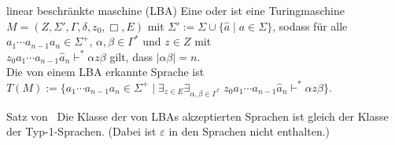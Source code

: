 \begin{Def}{linear beschränkte maschine (LBA)}
    Eine  oder
     ist eine Turingmaschine
    $M = (Z, \Sigma', \Gamma, \delta, z_0, \Box, E)$ mit
    $\Sigma' := \Sigma \cup \{\widehat{a} \;|\; a \in \Sigma\}$,
    sodass für alle $a_1 \dotsb a_{n-1} a_n \in \Sigma^+$,
    $\alpha, \beta \in \Gamma^\ast$ und $z \in Z$ mit\\
    $z_0 a_1 \dotsb a_{n-1} \widehat{a}_{n} \vdash^\ast \alpha z \beta$ gilt,
    dass $|\alpha \beta| = n$.\\
    Die von einem LBA erkannte Sprache ist\\
    $T(M) := \{a_1 \dotsb a_{n-1} a_n \in \Sigma^+ \;|\;
    \exists_{z \in E} \exists_{\alpha, \beta \in \Gamma^\ast}\;
    z_0 a_1 \dotsb a_{n-1} \widehat{a}_n \vdash^\ast \alpha z \beta\}$.
\end{Def}

\linie

\begin{Satz}{Satz von \upshape\,\!}
    Die Klasse der von LBAs akzeptierten Sprachen ist gleich
    der Klasse der Typ-1-Sprachen.
    (Dabei ist $\varepsilon$ in den Sprachen nicht enthalten.)
\end{Satz}

